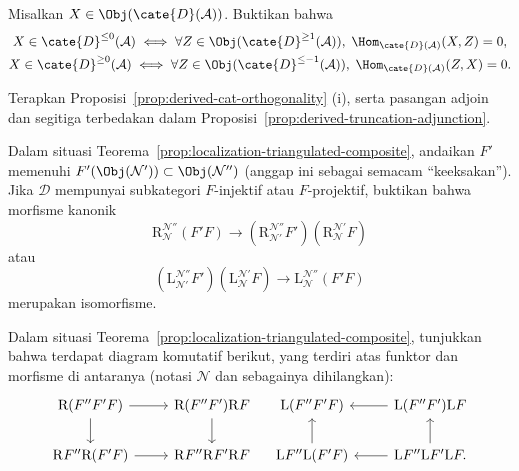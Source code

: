 \begin{Exercises}
	\item Misalkan $X\in\Obj(\cate{D}(\mathcal{A}))$. Buktikan bahwa
	\begin{gather*}
		X \in \cate{D}^{\leq 0}(\mathcal{A}) \iff \forall Z \in \Obj(\cate{D}^{\geq 1}(\mathcal{A})), \; \Hom_{\cate{D}(\mathcal{A})}(X, Z) = 0, \\
		X \in \cate{D}^{\geq 0}(\mathcal{A}) \iff \forall Z \in \Obj(\cate{D}^{\leq -1}(\mathcal{A})), \; \Hom_{\cate{D}(\mathcal{A})}(Z, X) = 0.
	\end{gather*}
	\begin{hint}
		Terapkan Proposisi~\ref{prop:derived-cat-orthogonality} (i), serta
		pasangan adjoin dan segitiga terbedakan dalam
		Proposisi~\ref{prop:derived-truncation-adjunction}.
	\end{hint}

	\item Dalam situasi Teorema~\ref{prop:localization-triangulated-composite},
	andaikan $F'$ memenuhi
	$F'(\Obj(\mathcal{N}'))\subset\Obj(\mathcal{N}'')$ (anggap ini sebagai
	semacam ``keeksakan''). Jika $\mathcal{D}$ mempunyai subkategori
	$F$-injektif atau $F$-projektif, buktikan bahwa morfisme kanonik
	\[ \mathrm{R}^{\mathcal{N}''}_{\mathcal{N}} (F' F) \to \left( \mathrm{R}^{\mathcal{N}''}_{\mathcal{N}'} F' \right) \left( \mathrm{R}^{\mathcal{N}'}_{\mathcal{N}} F \right) \]
	atau
	\[ \left( \mathrm{L}^{\mathcal{N}''}_{\mathcal{N'}} F' \right) \left( \mathrm{L}^{\mathcal{N}'}_{\mathcal{N}} F \right) \to \mathrm{L}^{\mathcal{N}''}_{\mathcal{N}} (F' F) \]
	merupakan isomorfisme.
	
	\item Dalam situasi Teorema~\ref{prop:localization-triangulated-composite},
	tunjukkan bahwa terdapat diagram komutatif berikut, yang terdiri atas
	funktor dan morfisme di antaranya (notasi $\mathcal{N}$ dan sebagainya
	dihilangkan):
	\[\begin{tikzcd}
		\mathrm{R}(F'' F' F) \arrow[r] \arrow[d] & \mathrm{R}(F'' F') \mathrm{R}F \arrow[d] \\
		\mathrm{R}F'' \mathrm{R}(F'F) \arrow[r] & \mathrm{R}F'' \mathrm{R}F' \mathrm{R}F
	\end{tikzcd} \quad \begin{tikzcd}
		\mathrm{L}(F'' F' F) & \mathrm{L}(F'' F') \mathrm{L}F \arrow[l] \\
		\mathrm{L}F'' \mathrm{L}(F'F) \arrow[u] & \mathrm{L}F'' \mathrm{L}F' \mathrm{L}F \arrow[u] \arrow[l] .
	\end{tikzcd}\]


\end{Exercises}
